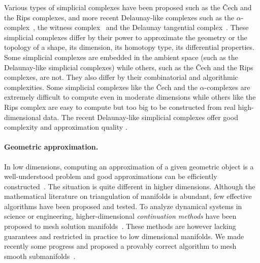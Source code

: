 Various types of simplicial complexes have been proposed such as the \v{C}ech and the Rips complexes, and more recent Delaunay-like complexes such as the $\alpha$-complex~\cite{he-ubds-95}, the witness complex~\cite{cds-tewc-2004} and the Delaunay tangential complex~\cite{geometrica-7142i}. These simplicial complexes differ by their power to approximate the geometry or the topology of a shape, its dimension, its homotopy type, its differential properties. Some simplicial complexes are embedded in the ambient space (such as the Delaunay-like simplicial complexes) while others, such as the \v{C}ech and the Rips complexes, are not. They also differ by their combinatorial and algorithmic complexities. %
Some simplicial complexes like the \v{C}ech and the $\alpha$-complexes are extremely difficult to compute
even in moderate dimensions while others like the Rips complex are easy to compute but too big
to be constructed from real high-dimensional data.  The recent Delaunay-like simplicial complexes
offer good complexity and approximation quality \cite{geometrica-7142i,cds-tewc-2004}.

\paragraph{Geometric approximation.}
In low dimensions, computing an approximation of a given geometric object is a well-understood problem and good approximations can be efficiently constructed~\cite{geometrica-bcmrv-ms-06,he-gtmg-2001}.  The situation is quite different in higher dimensions.  Although the mathematical literature on triangulation of manifolds is abundant, few effective algorithms have been proposed and tested.  To analyze {dynamical systems} in science or engineering, higher-dimensional {\em continuation methods} have been proposed to mesh solution manifolds~\cite{mh-mpc-2002}. These methods are however lacking guarantees and restricted in practice to low dimensional manifolds. 
We made recently some progress and proposed a provably correct algorithm to mesh smooth submanifolds~\cite{boissonnat2010meshing}.

